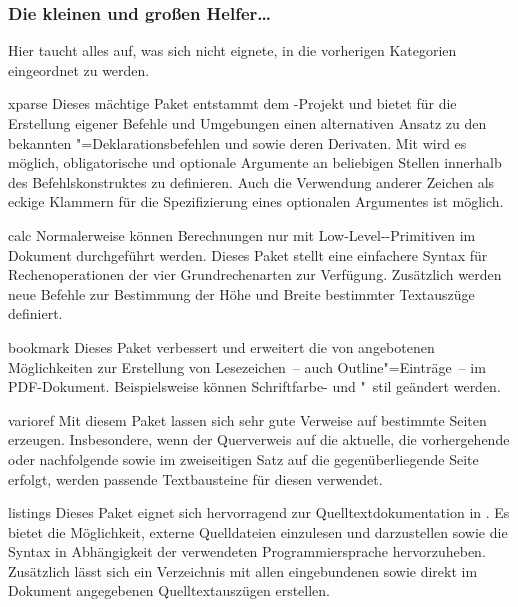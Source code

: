 \subsubsection{Die kleinen und großen Helfer\dots}
Hier taucht alles auf, was sich nicht eignete, in die vorherigen Kategorien 
eingeordnet zu werden.
%
\begin{packages}
\item[xparse]
  Dieses mächtige Paket entstammt dem -Projekt und bietet für 
  die Erstellung eigener Befehle und Umgebungen einen alternativen Ansatz zu 
  den bekannten "=Deklarationsbefehlen  und 
   sowie deren Derivaten. Mit  wird es 
  möglich, obligatorische und optionale Argumente an beliebigen Stellen 
  innerhalb des Befehlskonstruktes zu definieren. Auch die Verwendung anderer 
  Zeichen als eckige Klammern für die Spezifizierung eines optionalen 
  Argumentes ist möglich.
\item[calc]
  Normalerweise können Berechnungen nur mit Low-Level--Primitiven 
  im Dokument durchgeführt werden. Dieses Paket stellt eine einfachere Syntax 
  für Rechenoperationen der vier Grundrechenarten zur Verfügung. Zusätzlich 
  werden neue Befehle zur Bestimmung der Höhe und Breite bestimmter Textauszüge 
  definiert.
\item[bookmark]
  Dieses Paket verbessert und erweitert die von  angebotenen 
  Möglichkeiten zur Erstellung von Lesezeichen~-- auch Outline"=Einträge~-- im 
  PDF-Dokument. Beispielsweise können Schriftfarbe- und "~stil geändert werden.
\item[varioref]
  Mit diesem Paket lassen sich sehr gute Verweise auf bestimmte Seiten 
  erzeugen. Insbesondere, wenn der Querverweis auf die aktuelle, die 
  vorhergehende oder nachfolgende sowie im zweiseitigen Satz auf die 
  gegenüberliegende Seite erfolgt, werden passende Textbausteine für diesen 
  verwendet.
\item[listings]%
  Dieses Paket eignet sich hervorragend zur Quelltextdokumentation in 
  . Es bietet die Möglichkeit, externe Quelldateien einzulesen 
  und darzustellen sowie die Syntax in Abhängigkeit der verwendeten 
  Programmiersprache hervorzuheben. Zusätzlich lässt sich ein Verzeichnis mit 
  allen eingebundenen sowie direkt im Dokument angegebenen Quelltextauszügen 
  erstellen.
  

\end{packages}
